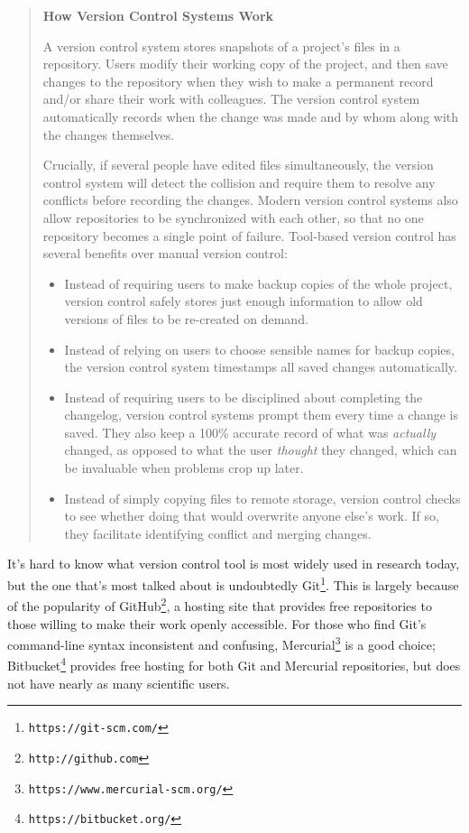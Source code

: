 \documentclass[10pt]{article}
\newcommand{\withurl}[2]{{#1}\footnote{\texttt{#2}}}
\begin{document}
\begin{quote}
  \noindent \textbf{How Version Control Systems Work}

  A version control system stores snapshots of a project's files in a
  repository. Users modify their working copy of the project, and then
  save changes to the repository when they wish to make
  a permanent record and/or share their work with colleagues. The
  version control system automatically records when the change was
  made and by whom along with the changes themselves.

  Crucially, if several people have edited files simultaneously, the
  version control system will detect the collision and require them to
  resolve any conflicts before recording the changes. Modern version
  control systems also allow repositories to be synchronized with each
  other, so that no one repository becomes a single point of failure.
  Tool-based version control has several benefits over manual version
  control:

  \begin{itemize}

  \item
    Instead of requiring users to make backup copies of the whole project,
    version control safely stores just enough information to allow old
    versions of files to be re-created on demand.

  \item
    Instead of relying on users to choose sensible names for backup
    copies, the version control system timestamps all saved changes
    automatically.

  \item
    Instead of requiring users to be disciplined about completing the
    changelog, version control systems prompt them every time a change
    is saved. They also keep a 100\% accurate record of what was
    \emph{actually} changed, as opposed to what the user
    \emph{thought} they changed, which can be invaluable when problems
    crop up later.

  \item
    Instead of simply copying files to remote storage, version control
    checks to see whether doing that would overwrite anyone else's
    work. If so, they facilitate identifying conflict and merging changes.

  \end{itemize}
\end{quote}

It's hard to know what version control tool is most widely used in
research today, but the one that's most talked about is undoubtedly
\withurl{Git}{https://git-scm.com/}.  This is largely because of the
popularity of \withurl{GitHub}{http://github.com}, a hosting site that
provides free repositories to those willing to make their work openly
accessible.  For those who find Git's command-line syntax inconsistent
and confusing, \withurl{Mercurial}{https://www.mercurial-scm.org/} is
a good choice; \withurl{Bitbucket}{https://bitbucket.org/} provides
free hosting for both Git and Mercurial repositories, but does not
have nearly as many scientific users.
\end{document}
